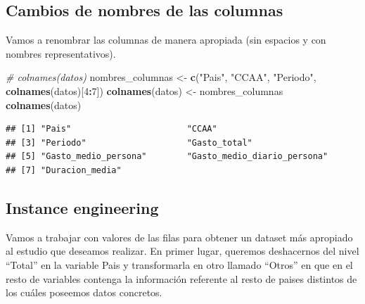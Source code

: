 \documentclass[data,article,submit,moreauthors,pdftex]{Definitions/mdpi}
\newenvironment{Shaded}{\begin{snugshade}}{\end{snugshade}}
\newcommand{\CommentTok}[1]{\textcolor[rgb]{0.56,0.35,0.01}{\textit{#1}}}
\newcommand{\DecValTok}[1]{\textcolor[rgb]{0.00,0.00,0.81}{#1}}
\newcommand{\FunctionTok}[1]{\textcolor[rgb]{0.13,0.29,0.53}{\textbf{#1}}}
\newcommand{\NormalTok}[1]{#1}
\newcommand{\OtherTok}[1]{\textcolor[rgb]{0.56,0.35,0.01}{#1}}
\newcommand{\SpecialCharTok}[1]{\textcolor[rgb]{0.81,0.36,0.00}{\textbf{#1}}}
\newcommand{\StringTok}[1]{\textcolor[rgb]{0.31,0.60,0.02}{#1}}
\begin{document}
\subsection{Cambios de nombres de las
columnas}\label{cambios-de-nombres-de-las-columnas}

Vamos a renombrar las columnas de manera apropiada (sin espacios y con
nombres representativos).

\begin{Shaded}
\begin{Highlighting}[]
\CommentTok{\# colnames(datos)}
\NormalTok{nombres\_columnas }\OtherTok{\textless{}{-}} \FunctionTok{c}\NormalTok{(}\StringTok{"Pais"}\NormalTok{, }\StringTok{"CCAA"}\NormalTok{, }\StringTok{"Periodo"}\NormalTok{, }\FunctionTok{colnames}\NormalTok{(datos)[}\DecValTok{4}\SpecialCharTok{:}\DecValTok{7}\NormalTok{])}
\FunctionTok{colnames}\NormalTok{(datos) }\OtherTok{\textless{}{-}}\NormalTok{ nombres\_columnas}
\FunctionTok{colnames}\NormalTok{(datos)}
\end{Highlighting}
\end{Shaded}

\begin{verbatim}
## [1] "Pais"                       "CCAA"                      
## [3] "Periodo"                    "Gasto_total"               
## [5] "Gasto_medio_persona"        "Gasto_medio_diario_persona"
## [7] "Duracion_media"
\end{verbatim}

\subsection{Instance engineering}\label{instance-engineering}

Vamos a trabajar con valores de las filas para obtener un dataset más
apropiado al estudio que deseamos realizar. En primer lugar, queremos
deshacernos del nivel ``Total'' en la variable Pais y transformarla en
otro llamado ``Otros'' en que en el resto de variables contenga la
información referente al resto de paises distintos de los cuáles
poseemos datos concretos.

\begin{Shaded}
\end{Shaded}
\end{document}
